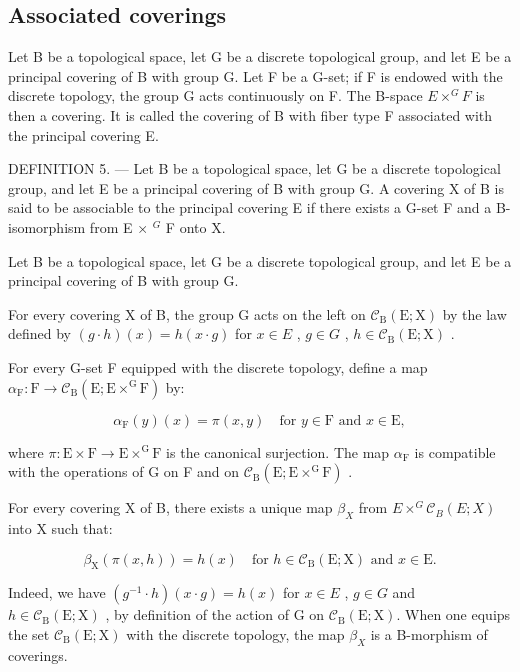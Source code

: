 \subsection{Associated coverings}

Let B be a topological space, let G be a discrete topological group, and let E be a principal covering of B with group G. Let F be a G-set; if F is endowed with the discrete topology, the group G acts continuously on F. The B-space \(E \times^{G} F\) is then a covering. It is called the covering of B with fiber type F associated with the principal covering E.

DEFINITION 5. --- Let B be a topological space, let G be a discrete topological group, and let E be a principal covering of B with group G. A covering X of B is said to be associable to the principal covering E if there exists a G-set F and a B-isomorphism from E × \(^{G}\) F onto X.

Let B be a topological space, let G be a discrete topological group, and let E be a principal covering of B with group G.

For every covering X of B, the group G acts on the left on \(\mathcal{C}_{\mathrm{B}}(\mathrm{E};\mathrm{X})\) by the law defined by \((g\cdot h)(x)=h(x\cdot g)\) for \(x\in E\) , \(g\in G\) , \(h\in\mathcal{C}_{\mathrm{B}}(\mathrm{E};\mathrm{X})\) .

For every G-set F equipped with the discrete topology, define a map \(\alpha_{\mathrm{F}}\colon \mathrm{F}\to \mathcal{C}_{\mathrm{B}}(\mathrm{E};\mathrm{E}\times^{\mathrm{G}}\mathrm{F})\) by:

\[
\alpha_ {\mathrm{F}} (y) (x) = \pi (x, y) \quad \text {for } y \in \mathrm{F} \text { and } x \in \mathrm{E},\tag{2}
\]

where \(\pi\colon\mathrm{E}\times\mathrm{F}\to\mathrm{E}\times^{\mathrm{G}}\mathrm{F}\) is the canonical surjection. The map \(\alpha_{\mathrm{F}}\) is compatible with the operations of G on F and on \(\mathcal{C}_{\mathrm{B}}(\mathrm{E};\mathrm{E}\times^{\mathrm{G}}\mathrm{F})\) .

For every covering X of B, there exists a unique map \(\beta_{X}\) from \(E \times^{G} \mathcal{C}_{B}(E; X)\) into X such that:

\[
\beta_ {\mathrm{X}} (\pi (x, h)) = h (x) \quad \text {for } h \in \mathcal {C} _ {\mathrm{B}} (\mathrm{E}; \mathrm{X}) \text { and } x \in \mathrm{E}.\tag{3}
\]

Indeed, we have \((g^{-1}\cdot h)(x\cdot g)=h(x)\) for \(x\in E\) , \(g\in G\) and \(h\in\mathcal{C}_{\mathrm{B}}(\mathrm{E};\mathrm{X})\) , by definition of the action of G on \(\mathcal{C}_{\mathrm{B}}(\mathrm{E};\mathrm{X})\). When one equips the set \(\mathcal{C}_{\mathrm{B}}(\mathrm{E};\mathrm{X})\) with the discrete topology, the map \(\beta_{X}\) is a B-morphism of coverings.

